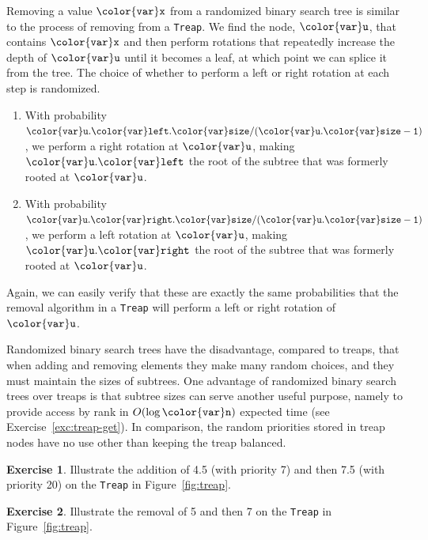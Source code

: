\documentclass[10pt]{book}
\newcommand{\figref}[1]{Figure~\ref{fig:#1}}
\theoremstyle{plain}
\theoremstyle{definition}
\newtheorem{exc}{Exercise}[chapter]
\newcommand{\excref}[1]{Exercise~\ref{exc:#1}}
\begin{document}
Removing a value \ensuremath{\mathtt{{\color{var}x}}} from a randomized binary search tree is similar
to the process of removing from a \texttt{Treap}.  We find the node, \ensuremath{\mathtt{{\color{var}u}}},
that contains \ensuremath{\mathtt{{\color{var}x}}} and then perform rotations that repeatedly increase
the depth of \ensuremath{\mathtt{{\color{var}u}}} until it becomes a leaf, at which point we can splice
it from the tree.  The choice of whether to perform a left or right
rotation at each step is randomized.
\begin{enumerate}
  \item With probability \ensuremath{\mathtt{{\color{var}u}.{\color{var}left}.{\color{var}size}/({\color{var}u}.{\color{var}size}-1)}}, we perform a right
  rotation at \ensuremath{\mathtt{{\color{var}u}}}, making \ensuremath{\mathtt{{\color{var}u}.{\color{var}left}}} the root of the subtree that was
  formerly rooted at \ensuremath{\mathtt{{\color{var}u}}}.
  \item  With probability \ensuremath{\mathtt{{\color{var}u}.{\color{var}right}.{\color{var}size}/({\color{var}u}.{\color{var}size}-1)}}, we perform a left
  rotation at \ensuremath{\mathtt{{\color{var}u}}}, making \ensuremath{\mathtt{{\color{var}u}.{\color{var}right}}} the root of the subtree that was
  formerly rooted at \ensuremath{\mathtt{{\color{var}u}}}.
\end{enumerate}
Again, we can easily verify that these are exactly the same probabilities
that the removal algorithm in a \texttt{Treap} will perform a left or right
rotation of \ensuremath{\mathtt{{\color{var}u}}}.

Randomized binary search trees have the disadvantage, compared to treaps,
that when adding and removing elements they make many random choices, and
they must maintain the sizes of subtrees.  One advantage of randomized
binary search trees over treaps is that subtree sizes can serve another
useful purpose, namely to provide access by rank in $O(\log \ensuremath{\mathtt{{\color{var}n}}})$ expected
time (see \excref{treap-get}).  In comparison, the random priorities
stored in treap nodes have no use other than keeping the treap balanced.

\begin{exc}
  Illustrate the addition of 4.5 (with priority 7) and then 7.5 (with
  priority 20) on the \texttt{Treap} in \figref{treap}.
\end{exc}

\begin{exc}
  Illustrate the removal of 5 and then 7 on the \texttt{Treap} in \figref{treap}.
\end{exc}
\end{document}

